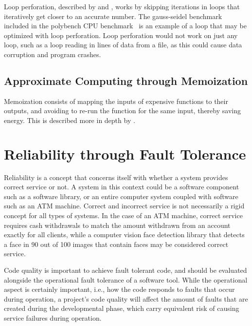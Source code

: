 Loop perforation, described by \citet{li2018sculptor} and \citet{baek2010green}, works by skipping iterations in loops that iteratively get closer to an accurate number. The gauss-seidel benchmark included in the polybench CPU benchmark~\citep{polybench} is an example of a loop that may be optimized with loop perforation. Loop perforation would not work on just any loop, such as a loop reading in lines of data from a file, as this could cause data corruption and program crashes.

\subsection{Approximate Computing through Memoization}

Memoization consists of mapping the inputs of expensive functions to their outputs, and avoiding to re-run the function for the same input, thereby saving energy. This is described more in depth by \citet{mittal2016survey}.


\section{Reliability through Fault Tolerance}
\label{section:Reliability_thorugh_fault_tolerance}

Reliability is a concept that concerns itself with whether a system provides correct service or not. A system in this context could be a software component such as a software library, or an entire computer system coupled with software such as an ATM machine. Correct and incorrect service is not necessarily a rigid concept for all types of systems. In the case of an ATM machine, correct service requires cash withdrawals to match the amount withdrawn from an account exactly for all clients, while a computer vision face detection library that detects a face in 90 out of 100 images that contain faces may be considered correct service.

Code quality is important to achieve fault tolerant code, and should be evaluated alongside the operational fault tolerance of a software tool. While the operational aspect is certainly important, i.e., how the code responds to faults that occur during operation, a project's code quality will affect the amount of faults that are created during the developmental phase, which carry equivalent risk of causing service failures during operation. 

